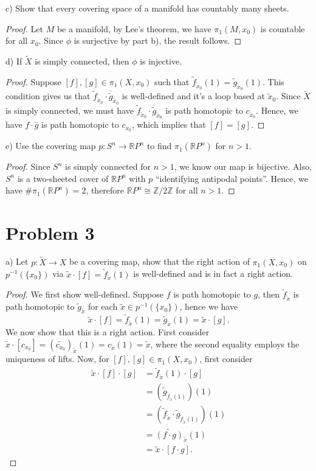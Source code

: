 \documentclass[11pt]{article} %
\newcommand{\R}{\mathbb{R}}
\newcommand{\wt}{\widetilde}
\newcommand{\Z}{\mathbb{Z}}
\begin{document}
c) Show that every covering space of a manifold has countably many sheets.

\begin{proof}
Let $M$ be a manifold, by Lee's theorem, we have $\pi_1(M,x_0)$ is countable for all $x_0$. Since $\phi$ is surjective by part b), the result follows.
\end{proof}

d) If $\wt{X}$ is simply connected, then $\phi$ is injective.


\begin{proof}
Suppose $[f],[g]\in \pi_1(X,x_0)$ such that $\wt{f}_{\wt{x}_0}(1) = \wt{g}_{\wt{x}_0}(1)$. This condition gives us that $\wt{f}_{\wt{x}_0}\cdot \overline{\wt{g}}_{\wt{x}_0}$ is well-defined and it's a loop based at $\wt{x}_0$. Since $\wt{X}$ is simply connected, we must have $\wt{f}_{\wt{x}_0}\cdot \overline{\wt{g}}_{\wt{x}_0}$ is path homotopic to $c_{\wt{x}_0}$. Hence, we have $f\cdot \bar{g}$ is path homotopic to $c_{x_0}$, which implies that $[f] = [g]$.
\end{proof}

e) Use the covering map $p:S^n\to \R P^n$ to find $\pi_1(\R P^n)$ for $n>1$.

\begin{proof}
Since $S^n$ is simply connected for $n>1$, we know our map is bijective. Also, $S^n$ is a two-sheeted cover of $\R P^n$ with $p$ ``identifying antipodal points''. Hence, we have $\# \pi_1(\R P^n) = 2$, therefore $\R P^n \cong \Z/2\Z$ for all $n>1$.
\end{proof}

\section*{Problem 3}
a) Let $p:\wt{X}\to X$ be a covering map, show that the right action of $\pi_1(X,x_0)$ on $p^{-1}(\{x_0\})$ via $\wt{x}\cdot [f] = \wt{f}_{\wt{x}}(1)$ is well-defined and is in fact a right action.

\begin{proof}
We first show well-defined. Suppose $f$ is path homotopic to $g$, then $\wt{f}_{\wt{x}}$ is path homotopic to $\wt{g}_{\wt{x}}$ for each $\wt{x}\in p^{-1}(\{x_0\})$, hence we have
\[\wt{x}\cdot [f] = \wt{f}_{\wt{x}}(1) =  \wt{g}_{\wt{x}}(1)= \wt{x}\cdot [g].\]
We now show that this is a right action. First consider $\wt{x}\cdot [c_{x_0}] = (\wt{c_{x_0}})_{\wt{x}}(1) = c_{\wt{x}}(1) = \wt{x}$, where the second equality employs the uniqueness of lifts. Now, for $[f],[g]\in \pi_1(X,x_0)$, first consider
\begin{align*}
\wt{x}\cdot [f]\cdot [g] & = \wt{f}_{\wt{x}}(1)\cdot [g] \\
& = \left(\wt{g}_{\wt{f}_{\wt{x}}(1)}\right)(1) \\
& = \left(\wt{f}_{\wt{x}}\cdot \wt{g}_{\wt{f}_{\wt{x}}(1)}\right)(1) \\
& = \wt{(f\cdot g)}_{\wt{x}}(1) \\
& = \wt{x}\cdot [f\cdot g].
\end{align*}
\end{proof}
\end{document}
